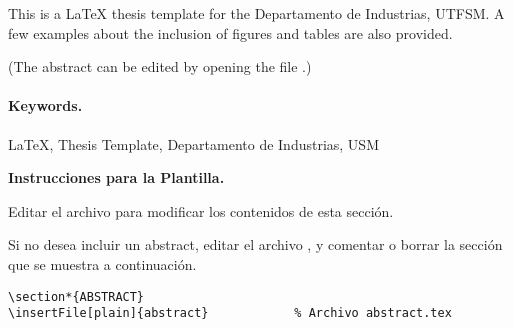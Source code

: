 
This is a \LaTeX{} thesis template for the Departamento de Industrias, UTFSM. A few examples about the inclusion of figures and tables are also provided.

(The abstract can be edited by opening the file .)

\vspace{20mm}

\paragraph{Keywords.}
\LaTeX{}, Thesis Template, Departamento de Industrias, USM

\vspace{20mm}


\begin{framed}
\noindent\textbf{Instrucciones para la Plantilla.}

Editar el archivo  para modificar los contenidos de esta sección.

Si no desea incluir un abstract, editar el archivo , y comentar o borrar la sección que se muestra a continuación.

\begin{Verbatim}[frame=lines, label=\inlinecode{/memoria.tex} (extracto)
				, fontsize=\footnotesize
				, baselinestretch=1
				, formatcom=\color{gray}]
\section*{ABSTRACT}
\insertFile[plain]{abstract}			% Archivo abstract.tex
\end{Verbatim}

\end{framed}